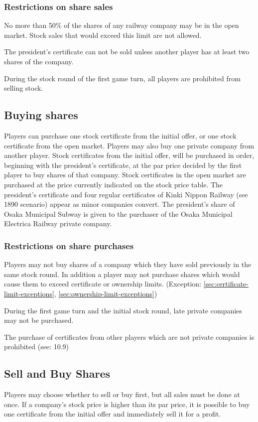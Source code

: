 \documentclass{article}
\begin{document}
\begin{CJK}{UTF8}{min}
\begin{multicols}{2}
\subsubsection{Restrictions on share sales}
\label{sr-sell-restrictions}
No more than 50\% of the shares of any railway company may be in the
open market. Stock sales that would exceed this limit are not
allowed.

The president's certificate can not be sold unless another player
has at least two shares of the company.

During the stock round of the first game turn, all players are
prohibited from selling stock.

\subsection{Buying shares} \label{sr-buy}
Players can purchase one stock certificate from the initial offer, or
one stock certificate from the open market. Players may also buy one
private company from another player.  Stock certificates from the
initial offer, will be purchased in order, beginning with the
president's certificate, at the par price decided by the first player
to buy shares of that company. Stock certificates in the open market
are purchased at the price currently indicated on the stock price
table. The president's certificate and four regular certificates of
Kinki Nippon Railway (see 1890 scenario) appear as minor companies
convert. The president's share of Osaka Municipal Subway is given to the
purchaser of the Osaka Municipal Electrica Railway private company.

\subsubsection{Restrictions on share purchases}
Players may not buy shares of a company which they have sold
previously in the same stock round. In addition a player may not
purchase shares which would cause them to exceed certificate or
ownership limits. (Exception: \autoref{sec:certificate-limit-exceptions},
\autoref{sec:ownership-limit-exceptions})

During the first game turn and the initial stock round, late private
companies may not be purchased.

The purchase of certificates from other players which are not private
companies is prohibited (see: 10.9)

\subsection{Sell and Buy Shares} \label{sr-sell-buy}
Players may choose whether to sell or buy first, but all sales must be
done at once. If a company's stock price is higher than its par price,
it is possible to buy one certificate from the initial offer and
immediately sell it for a profit.


\end{multicols}
\end{CJK}
\end{document}
